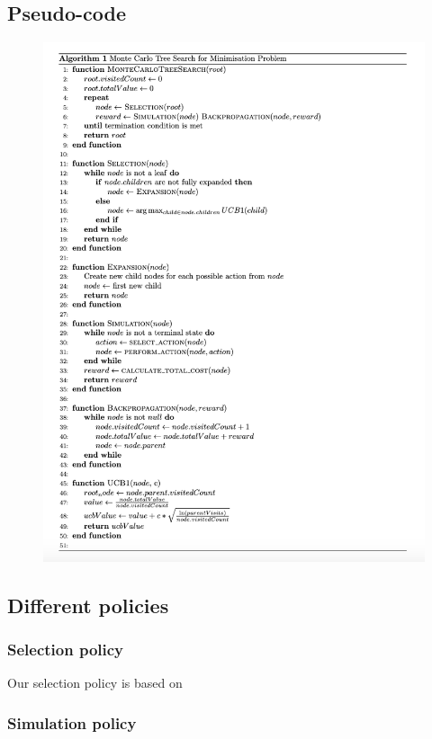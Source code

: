 \newpage
\subsection{Pseudo-code}
\begin{figure}[!ht]
    \centering
    \includegraphics[width=1\textwidth]{Figures/Pseudo code.png}
    \end{figure}
\newpage
\subsection{Different policies}
\subsubsection{Selection policy}
Our selection policy is based on 
\subsubsection{Simulation policy}


